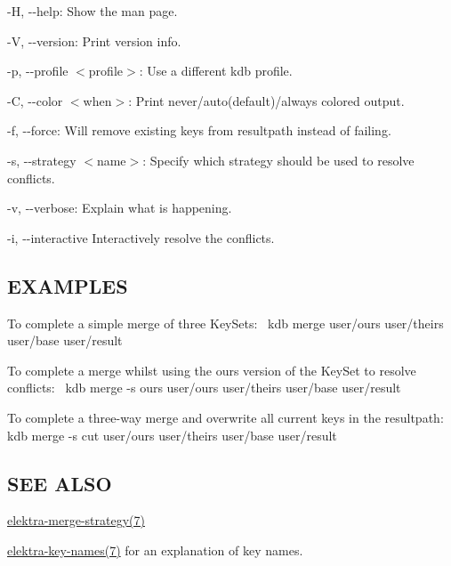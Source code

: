 \begin{DoxyItemize}
\item {\ttfamily -\/H}, {\ttfamily -\/-\/help}\+: Show the man page.
\item {\ttfamily -\/V}, {\ttfamily -\/-\/version}\+: Print version info.
\item {\ttfamily -\/p}, {\ttfamily -\/-\/profile $<$profile$>$}\+: Use a different kdb profile.
\item {\ttfamily -\/C}, {\ttfamily -\/-\/color $<$when$>$}\+: Print never/auto(default)/always colored output.
\item {\ttfamily -\/f}, {\ttfamily -\/-\/force}\+: Will remove existing keys from {\ttfamily resultpath} instead of failing.
\item {\ttfamily -\/s}, {\ttfamily -\/-\/strategy $<$name$>$}\+: Specify which strategy should be used to resolve conflicts.
\item {\ttfamily -\/v}, {\ttfamily -\/-\/verbose}\+: Explain what is happening.
\item {\ttfamily -\/i}, {\ttfamily -\/-\/interactive} Interactively resolve the conflicts.
\end{DoxyItemize}

\subsection*{E\+X\+A\+M\+P\+L\+ES}

To complete a simple merge of three Key\+Sets\+:~\newline
 {\ttfamily kdb merge user/ours user/theirs user/base user/result}~\newline


To complete a merge whilst using the {\ttfamily ours} version of the Key\+Set to resolve conflicts\+:~\newline
 {\ttfamily kdb merge -\/s ours user/ours user/theirs user/base user/result}~\newline


To complete a three-\/way merge and overwrite all current keys in the {\ttfamily resultpath}\+:~\newline
 {\ttfamily kdb merge -\/s cut user/ours user/theirs user/base user/result}~\newline


\subsection*{S\+EE A\+L\+SO}


\begin{DoxyItemize}
\item \hyperlink{doc_help_elektra-merge-strategy_md}{elektra-\/merge-\/strategy(7)}
\item \hyperlink{doc_help_elektra-key-names_md}{elektra-\/key-\/names(7)} for an explanation of key names. 
\end{DoxyItemize}